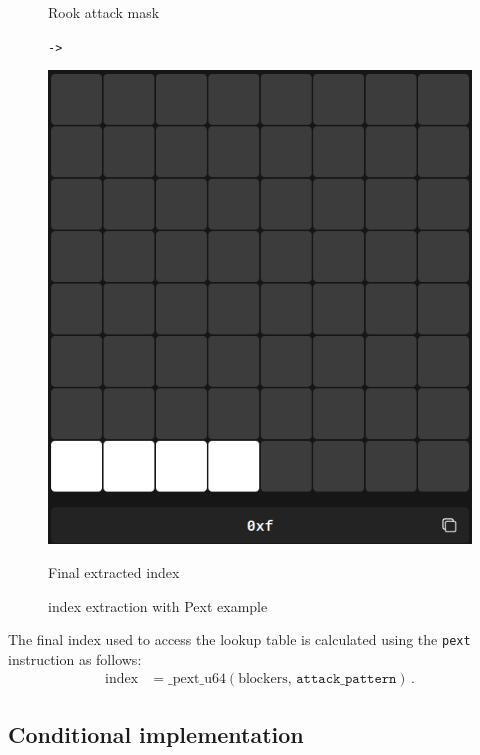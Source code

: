 \begin{figure}
\begin{minipage}[c]{0.3\textwidth}
        \caption{Rook attack mask}
    \end{minipage}
    \hfill
    \begin{minipage}[c]{0.05\textwidth}
        \centering
        \Huge\texttt{->}
    \end{minipage}
    \hfill
    \begin{minipage}[c]{0.3\textwidth}
        \centering
        \includegraphics[width=\textwidth]{Imagenes/pext_final_index.png}
        \caption{Final extracted index}
    \end{minipage}
    \caption{index extraction with Pext example}\label{fig:pext_bitboards}
\end{figure}

\noindent The final index used to access the lookup table is calculated using the \texttt{pext} instruction as follows:
\begin{align*}
    \text{index}
    &= \text{\_pext\_u64}(\text{blockers},\,\texttt{attack\_pattern})\,.
\end{align*}

\subsection*{Conditional implementation}

